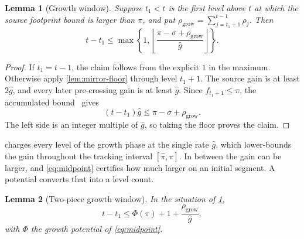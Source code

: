 \documentclass[11pt]{article}
\theoremstyle{plain}
\newtheorem{lemma}{Lemma}
\theoremstyle{remark}
\newcommand{\ghat}{\widehat g}
\newcommand{\pihat}{\widehat{\pi}}
\newcommand{\Pot}{\Phi}
\newcommand{\spend}[2]{\sum_{j=#1}^{#2}\rho_j}
\begin{document}
\begin{lemma}[Growth window]
\label{lem:growth-window}
Suppose \(t_1<t\) is the first level above \(t\) at which the source footprint bound
is larger than \(\pi\), and put
\(\rho_{\mathrm{grow}}=\spend{t_1+1}{t-1}\).  Then
\begin{equation}
 t-t_1\le
 \max\left\{1,
 \left\lfloor\frac{\pi-\sigma+\rho_{\mathrm{grow}}}{\ghat}\right\rfloor\right\}.
 \label{eq:growth-window}
\end{equation}
\end{lemma}

\begin{proof}
If \(t_1=t-1\), the claim follows from the explicit \(1\) in the maximum.
Otherwise apply \cref{lem:mirror-floor} through level \(t_1+1\).  The source gain is
at least \(2\ghat\), and every later pre-crossing gain is at least \(\ghat\).  Since
\(f_{t_1+1}\le\pi\), the accumulated bound~\cite[Claim 3]{FOCS:Reyzin24} gives
\[
 (t-t_1)\ghat\le\pi-\sigma+\rho_{\mathrm{grow}}.
\]
The left side is an integer multiple of \(\ghat\), so taking the floor proves the
claim.
\end{proof}

 charges every level of the growth phase at the single rate
\(\ghat\), which lower-bounds the gain throughout the tracking interval
\([\pihat,\pi]\).  In between the gain can be larger, and \eqref{eq:midpoint} certifies
how much larger on an initial segment.  A potential converts that into a level count.

\begin{lemma}[Two-piece growth window]
\label{lem:potential-window}
In the situation of \cref{lem:growth-window},
\begin{equation}
 t-t_1\le\Pot(\pi)+1+\frac{\rho_{\mathrm{grow}}}{\ghat},
 \label{eq:potential-window}
\end{equation}
with \(\Pot\) the growth potential of \eqref{eq:midpoint}.
\end{lemma}
\end{document}
